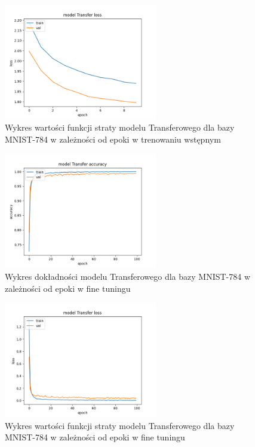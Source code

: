 \documentclass{article}
\begin{document}
\begin{figure}[H]
    \centering
    \includegraphics[width=0.6\textwidth]{../Saves/Transfer/mnist-784/Transfer_mnist_784_ep10_loss.png}
    \caption{Wykres wartości funkcji straty modelu Transferowego dla bazy MNIST-784 w zależności od epoki w trenowaniu wstępnym} 
\end{figure}

\begin{figure}[H]
    \centering
    \includegraphics[width=0.6\textwidth]{../Saves/Transfer/mnist-784/Transfer_mnist_784_ep100_acc.png}
    \caption{Wykres dokładności modelu Transferowego dla bazy MNIST-784 w zależności od epoki w fine tuningu}
\end{figure}

\begin{figure}[H]
    \centering
    \includegraphics[width=0.6\textwidth]{../Saves/Transfer/mnist-784/Transfer_mnist_784_ep100_loss.png}
    \caption{Wykres wartości funkcji straty modelu Transferowego dla bazy MNIST-784 w zależności od epoki w fine tuningu} 
\end{figure}
\end{document}
